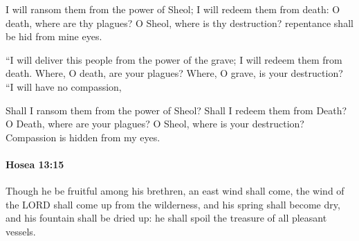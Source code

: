 			\begin{versebox}
					\item[BHS] 
					\item[LXX] 
					\item[ASV] I will ransom them from the power of Sheol; I will redeem them from death: O death, where are thy plagues? O Sheol, where is thy destruction? repentance shall be hid from mine eyes.
					\item[NIV] “I will deliver this people from the power of the grave; I will redeem them from death. Where, O death, are your plagues? Where, O grave, is your destruction? “I will have no compassion,
					\item[NRSV] Shall I ransom them from the power of Sheol? Shall I redeem them from Death? O Death, where are your plagues? O Sheol, where is your destruction? Compassion is hidden from my eyes.
			\end{versebox}

		\paragraph{Hosea 13:15} %
			\label{HOSEA-13-15}

			Though he be fruitful among his brethren, an east wind shall come, the wind of the LORD shall come up from the wilderness, and his spring shall become dry, and his fountain shall be dried up: he shall spoil the treasure of all pleasant vessels.

